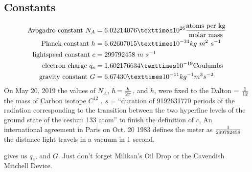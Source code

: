 \begin{multicols}{2}
\section{Constants}\begin{align*}%
\text{Avogadro constant } N_A&=6.02214076×10^{26} {\text{atoms per kg} \over \text{molar mass}}\\
\text{Planck constant } h&= 6.62607015 × 10^{-34} kg~m^2~ s^{-1}\\
\text{lightspeed constant } c&=299792458 ~m~s^{-1}\\
\text{electron charge }q_e&=1.602176634 × 10^{-19} \text{Coulumbs}\\
\text{gravity constant }G&=6.674 30 × 10^{-11}kg^{-1} m^3 s^{-2}
\end{align*}
On May 20, 2019 the values of $N_A$, $\hbar ={{h} \over {2\pi }} $, and $h$, were fixed to the Dalton = ${1 \over 12}$ the mass of Carbon isotope $C^{12}$  \citep{Horst1}. 
$s$ = ``duration of 9192631770 periods of the radiation corresponding to the transition between the two hyperfine levels of the ground state of the cesium 133 atom''\citep{CGPM13} %
to finish the definition of $c$, An international agreement in Paris on Oct. 20 1983 defines the meter as $1\over 299792458$ the distance light travels in a vacuum in 1 second\citep{newspaper_1983}, %

\citep{RevModPhys.93.025010} gives us $q_e$, and $G$. Just don't forget Milikan's Oil Drop or the Cavendish Mitchell Device. 

\end{multicols}
